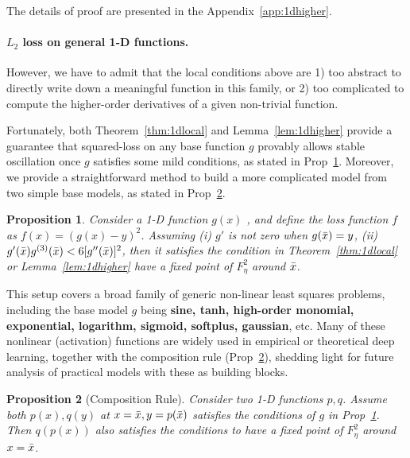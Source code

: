\documentclass{article}
\theoremstyle{plain}
\newtheorem{prop}{Proposition}
\theoremstyle{remark}
\newcommand{\T}[1]{^{(#1)}}
\begin{document}
The details of proof are presented in the Appendix~\ref{app:1dhigher}.


\paragraph{$L_2$ loss on general 1-D functions.} 
However, we have to admit that the local conditions above are 1) too abstract to directly write down a meaningful function in this family, or 2) too complicated to compute the higher-order derivatives of a given non-trivial function.

Fortunately, both Theorem~\ref{thm:1dlocal} and Lemma~\ref{lem:1dhigher} provide a guarantee that squared-loss on any base function $g$ provably allows stable oscillation once $g$ satisfies some mild conditions, as stated in Prop~\ref{prop:l2loss}. Moreover, we provide a straightforward method to build a more complicated model from two simple base models, as stated in Prop~\ref{prop:comp}.
\begin{prop}
Consider a 1-D function $g(x)$ , and define the loss function $f$ as $f(x) = (g(x)-y)^2$. Assuming (i) $g'$ is not zero when $g(\Bar{x})=y$, (ii) $g'(\Bar{x})g\T{3}(\Bar{x}) < 6[g''(\Bar{x})]^2$, then it satisfies the condition in Theorem~\ref{thm:1dlocal} or Lemma~\ref{lem:1dhigher} have a fixed point of $F^2_\eta$ around $\Bar{x}$. 
\label{prop:l2loss}
\end{prop}
This setup covers a broad family of generic non-linear least squares problems, including the base model $g$ being \textbf{sine, tanh, high-order monomial, exponential, logarithm, sigmoid, softplus, gaussian}, etc. Many of these nonlinear (activation) functions are widely used in empirical or theoretical deep learning, together with the composition rule (Prop~\ref{prop:comp}), shedding light for future analysis of practical models with these as building blocks. 
\begin{prop}[Composition Rule]
    Consider two 1-D functions $p,q$. Assume both $p(x),q(y)$ at $x=\Bar{x}, y=p(\Bar{x})$ satisfies the conditions of $g$ in Prop~\ref{prop:l2loss}. Then $q(p(x))$ also satisfies the conditions to have a fixed point of $F^2_\eta$ around $x=\Bar{x}$.
    \label{prop:comp}
\end{prop}
\end{document}
